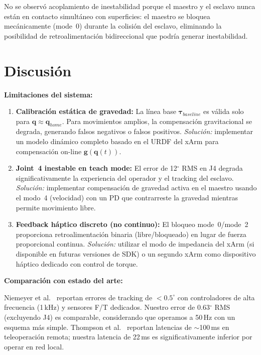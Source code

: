 \documentclass[journal,10pt,twoside]{IEEEtran}
\begin{document}
No se observó acoplamiento de inestabilidad porque el
maestro y el esclavo nunca están en contacto simultáneo con superficies:
el maestro se bloquea mecánicamente (mode~0) durante la colisión del
esclavo, eliminando la posibilidad de retroalimentación bidireccional
que podría generar inestabilidad.

\section{Discusión}
\label{sec:discussion}


\textbf{Limitaciones del sistema:}

\begin{enumerate}
  \item \textbf{Calibración estática de gravedad:} La línea base
        $\bm{\tau}_{baseline}$ es válida solo para $\bm{q}\approx\bm{q}_{home}$.
        Para movimientos amplios, la compensación gravitacional se
        degrada, generando falsos negativos o falsos positivos.
        \textit{Solución:} implementar un modelo dinámico completo
        basado en el URDF del xArm para compensación on-line
        $\bm{g}(\bm{q}(t))$.

  \item \textbf{Joint~4 inestable en teach mode:}
        El error de 12$^\circ$ RMS en J4 degrada significativamente
        la experiencia del operador y el tracking del esclavo.
        \textit{Solución:} implementar compensación de gravedad activa
        en el maestro usando el modo~4 (velocidad) con un PD que
        contrarreste la gravedad mientras permite movimiento libre.

  \item \textbf{Feedback háptico discreto (no continuo):}
        El bloqueo mode~0/mode~2 proporciona retroalimentación binaria
        (libre/bloqueado) en lugar de fuerza proporcional continua.
        \textit{Solución:} utilizar el modo de impedancia del xArm
        (si disponible en futuras versiones de SDK) o un segundo
        xArm como dispositivo háptico dedicado con control de torque.
\end{enumerate}

\textbf{Comparación con estado del arte:}

Niemeyer et al.~\cite{niemeyer2008} reportan errores de tracking de
$<0{.}5^\circ$ con controladores de alta frecuencia (1\,kHz) y sensores
F/T dedicados. Nuestro error de 0.63$^\circ$ RMS (excluyendo J4)
es comparable, considerando que operamos a 50\,Hz con un esquema más
simple. Thompson et al.~\cite{thompson2001} reportan latencias de
$\sim$100\,ms en teleoperación remota; nuestra latencia de 22\,ms es
significativamente inferior por operar en red local.
\end{document}
